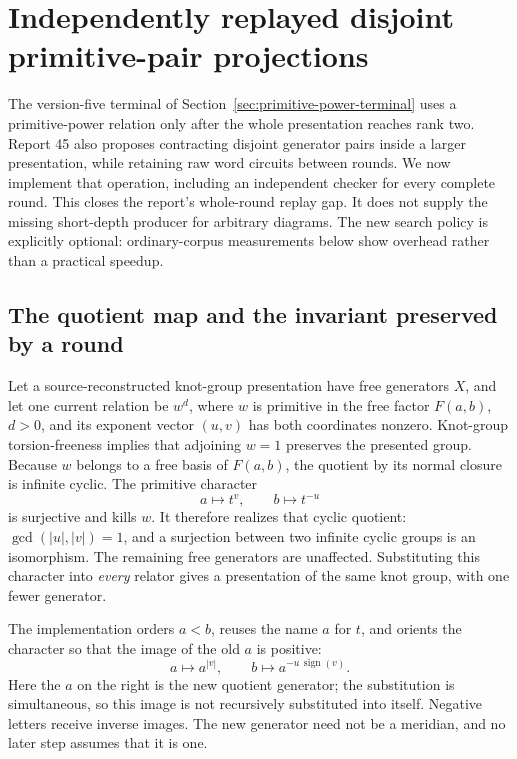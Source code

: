 \section{Independently replayed disjoint primitive-pair projections}
\label{sec:primitive-projections}

The version-five terminal of Section~\ref{sec:primitive-power-terminal}
uses a primitive-power relation only after the whole presentation reaches
rank two. Report 45 also proposes contracting disjoint generator pairs
inside a larger presentation, while retaining raw word circuits between
rounds. We now implement that operation, including an independent checker
for every complete round. This closes the report's whole-round replay gap.
It does not supply the missing short-depth producer for arbitrary diagrams.
The new search policy is explicitly optional: ordinary-corpus measurements
below show overhead rather than a practical speedup.

\subsection{The quotient map and the invariant preserved by a round}

Let a source-reconstructed knot-group presentation have free generators
$X$, and let one current relation be $w^d$, where $w$ is primitive in the
free factor $F(a,b)$, $d>0$, and its exponent vector $(u,v)$ has both
coordinates nonzero. Knot-group torsion-freeness implies that adjoining
$w=1$ preserves the presented group. Because $w$ belongs to a free basis
of $F(a,b)$, the quotient by its normal closure is infinite cyclic.
The primitive character
\[
 a\longmapsto t^v,\qquad b\longmapsto t^{-u}
\]
is surjective and kills $w$. It therefore realizes that cyclic quotient:
$\gcd(|u|,|v|)=1$, and a surjection between two infinite cyclic groups is
an isomorphism. The remaining free generators are unaffected. Substituting
this character into \emph{every} relator gives a presentation of the same
knot group, with one fewer generator.

The implementation orders $a<b$, reuses the name $a$ for $t$, and orients
the character so that the image of the old $a$ is positive:
\[
 a\longmapsto a^{|v|},\qquad
 b\longmapsto a^{-u\,\operatorname{sign}(v)}.
\]
Here the $a$ on the right is the new quotient generator; the substitution
is simultaneous, so this image is not recursively substituted into itself.
Negative letters receive inverse images. The new generator need not be a
meridian, and no later step assumes that it is one.

